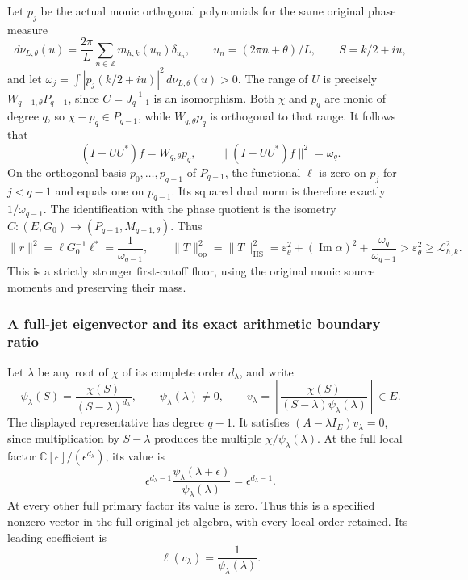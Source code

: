 Let \(p_j\) be the actual monic orthogonal polynomials for the same original phase measure
\[
 d\nu_{L,\theta}(u)
 =\frac{2\pi}{L}\sum_{n\in\mathbb Z}
       m_{h,k}(u_n)\delta_{u_n},\qquad
 u_n=(2\pi n+\theta)/L,\qquad S=k/2+iu,
 \]
and let \(\omega_j=\int|p_j(k/2+iu)|^2\,d\nu_{L,\theta}(u)>0\).
The range of \(U\) is precisely \(W_{q-1,\theta}P_{q-1}\), since \(C=J_{q-1}^{-1}\) is an isomorphism. Both \(\chi\) and \(p_q\) are monic of degree \(q\), so \(\chi-p_q\in P_{q-1}\), while \(W_{q,\theta}p_q\) is orthogonal to that range. It follows that
\[
 (I-UU^*)f=W_{q,\theta}p_q,\qquad
 \|(I-UU^*)f\|^2=\omega_q.
 \tag{PSC.59}
\]
On the orthogonal basis \(p_0,\ldots,p_{q-1}\) of \(P_{q-1}\), the functional \(\ell\) is zero on \(p_j\) for \(j<q-1\) and equals one on \(p_{q-1}\). Its squared dual norm is therefore exactly \(1/\omega_{q-1}\). The identification with the phase quotient is the isometry \(C:(E,G_0)\to(P_{q-1},M_{q-1,\theta})\). Thus
\[
 \|r\|^2=\ell G_0^{-1}\ell^*=\frac1{\omega_{q-1}},\qquad
 \boxed{\|T\|_{\mathrm{op}}^2=\|T\|_{\mathrm{HS}}^2
 =\varepsilon_\theta^2+(\operatorname{Im}\alpha)^2
     +\frac{\omega_q}{\omega_{q-1}}
 >\varepsilon_\theta^2\geq\mathcal L_{h,k}^2.}
 \tag{PSC.60}
\]
This is a strictly stronger first-cutoff floor, using the original monic source moments and preserving their mass.

\subsubsection{A full-jet eigenvector and its exact arithmetic boundary ratio}

Let \(\lambda\) be any root of \(\chi\) of its complete order \(d_\lambda\), and write
\[
 \psi_\lambda(S)=\frac{\chi(S)}{(S-\lambda)^{d_\lambda}},
 \qquad \psi_\lambda(\lambda)\ne0,\qquad
 v_\lambda=
 \left[\frac{\chi(S)}
 {(S-\lambda)\psi_\lambda(\lambda)}\right]\in E.
 \tag{PSC.61}
\]
The displayed representative has degree \(q-1\).
It satisfies \((A-\lambda I_E)v_\lambda=0\), since multiplication by \(S-\lambda\) produces the multiple \(\chi/\psi_\lambda(\lambda)\).
At the full local factor
\(\mathbb C[\epsilon]/(\epsilon^{d_\lambda})\), its value is
\[
 \epsilon^{d_\lambda-1}
 \frac{\psi_\lambda(\lambda+\epsilon)}{\psi_\lambda(\lambda)}
 =\epsilon^{d_\lambda-1}.
 \]
At every other full primary factor its value is zero. Thus this is a specified nonzero vector in the full original jet algebra, with every local order retained. Its leading coefficient is
\[
 \ell(v_\lambda)=\frac1{\psi_\lambda(\lambda)}.
 \tag{PSC.62}
\]

